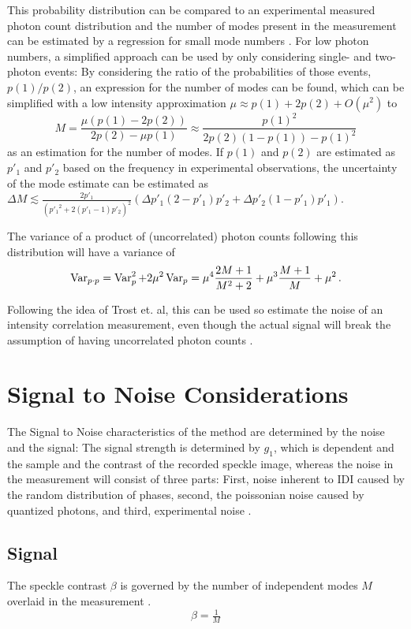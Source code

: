 This probability distribution can be compared to an experimental measured photon count distribution and the number of modes present in the measurement can be estimated by a regression for small mode numbers \cite{lehmkuhler2014,yun2019}. 
For low photon numbers, a simplified approach can be used by only considering single- and two-photon events: By considering the ratio of the probabilities of those events, $p(1) / p(2)$,  an expression for the number of modes can be found, which can be simplified with a low intensity approximation $\mu\approx p(1)+2p(2)+O(\mu^2)$ to 
\begin{equation}
	M=\frac{\mu  (p(1)-2 p(2))}{2 p(2)-\mu  p(1)}\approx \frac{p(1)^2}{2 p(2) (1-p(1))-p(1)^2}
	\label{eq:modesp1p2}
\end{equation}
as an estimation for the number of modes.
If $p(1)$ and $p(2)$ are estimated as $p'_1$ and $p'_2$ based on the frequency in experimental observations, the uncertainty of the mode estimate can be estimated as 
$\Delta M \lesssim \frac{2 p'_1}{\left({p'_1}^2+2 (p'_1-1) p'_2\right)^2} \left(\Delta p'_1 (2-p'_1) p'_2+\Delta p'_2 (1-p'_1) p'_1\right)$.

The variance of a product of (uncorrelated) photon counts following this distribution will have a variance of
\begin{equation}
	\operatorname{Var}_{p\cdot p}= \operatorname{Var}_p^2 +2 \mu^2\operatorname{Var}_p	= \mu^4 \frac{2 M + 1}{M^2 + 2}+ \mu^3 \frac{M+1}{M} + \mu^2 \,.
\end{equation}

Following the idea of Trost et. al, this can be used so estimate the noise of an intensity correlation measurement, even though the actual signal will break the assumption of having uncorrelated photon counts \cite{trost2020}.


\section{Signal to Noise Considerations}

The Signal to Noise characteristics of the method are determined by the noise and the signal:
The signal strength is determined by $g_1$, which is dependent and the sample and the contrast of the recorded speckle image, whereas the noise in the measurement will consist of three parts: First, noise inherent to IDI caused by the random distribution of phases, second, the poissonian noise caused by quantized photons, and third, experimental noise \cite{trost2020, goodman2007}. 

\subsection{Signal}
The speckle contrast $\beta$ is governed by the number of independent modes $M$ overlaid in the measurement \cite{goodman2000}.
\begin{equation}
\beta =\tfrac{1}{M}
\end{equation}

